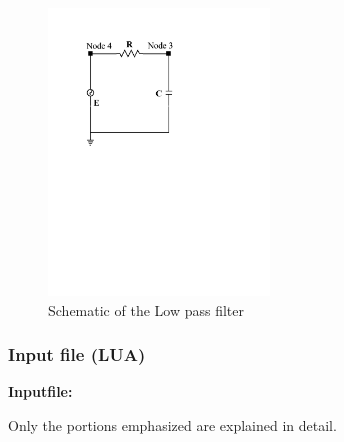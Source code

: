\begin{figure}[htbp]
\centering
\includegraphics[trim = 0in 5in 1in 1in, clip, height = 3in]{fig/lowpassfilter.pdf}
\caption{Schematic of the Low pass filter}
\label{fig:LowPassFilter}
\end{figure}

\clearpage
\subsubsection*{Input file (LUA)}
\begin{flushleft}
  \textbf{Inputfile:}
  \\
\end{flushleft}
\hspace{1in}
{\footnotesize
{}
}

\clearpage
Only the portions emphasized are explained in detail.

